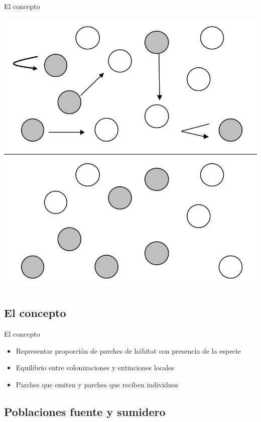 \documentclass[
  11pt,
  ignorenonframetext,
]{beamer}
\begin{document}
\begin{frame}{El concepto}
\begin{center}\includegraphics{Metapoblaciones/MEtap-May} \end{center}
\end{frame}

\hypertarget{el-concepto-1}{%
\subsection{El concepto}\label{el-concepto-1}}

\begin{frame}{El concepto}
\begin{itemize}
\item
  Representar proporción de parches de hábitat con presencia de la
  especie
\item
  Equilibrio entre colonizaciones y extinciones locales
\item
  Parches que emiten y parches que reciben individuos
\end{itemize}
\end{frame}

\hypertarget{poblaciones-fuente-y-sumidero}{%
\subsection{Poblaciones fuente y
sumidero}\label{poblaciones-fuente-y-sumidero}}
\end{document}
